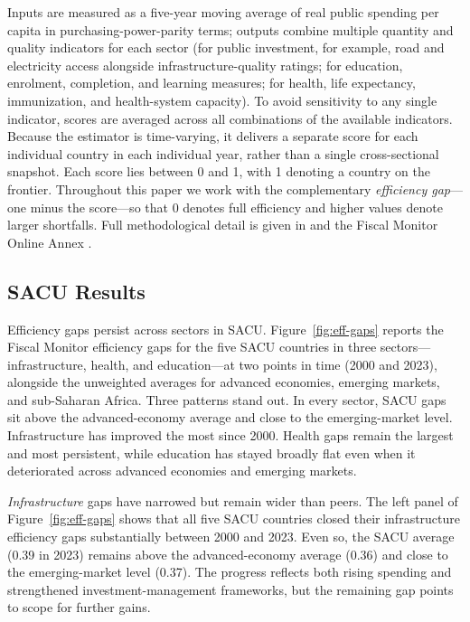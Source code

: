 \documentclass[11pt]{article}
\begin{document}
Inputs are measured as a five-year moving average of real public spending per
capita in purchasing-power-parity terms; outputs combine multiple quantity and
quality indicators for each sector (for public investment, for example, road and
electricity access alongside infrastructure-quality ratings; for education,
enrolment, completion, and learning measures; for health, life expectancy,
immunization, and health-system capacity). To avoid sensitivity to any single
indicator, scores are averaged across all combinations of the available
indicators. Because the estimator is time-varying, it delivers a separate score
for each individual country in each individual year, rather than a single
cross-sectional snapshot. Each score lies between 0 and 1, with 1 denoting a
country on the frontier. Throughout this
paper we work with the complementary \emph{efficiency gap}---one minus the
score---so that 0 denotes full efficiency and higher values denote larger
shortfalls. Full methodological detail is given in
\textcite{bankowskichosher2026} and the Fiscal Monitor Online Annex
\parencite{imf2025annex}.

\subsection{SACU Results}
\label{sec:sacu-results}

Efficiency gaps persist across sectors in SACU. Figure~\ref{fig:eff-gaps}
reports the Fiscal Monitor efficiency gaps for the five SACU countries in three
sectors---infrastructure, health, and education---at two points in time (2000
and 2023), alongside the unweighted averages for advanced economies, emerging
markets, and sub-Saharan Africa. Three patterns stand out. In every sector,
SACU gaps sit above the advanced-economy average and close to the
emerging-market level. Infrastructure has improved the most since 2000. Health
gaps remain the largest and most persistent, while education has stayed broadly
flat even when it deteriorated across advanced economies and emerging markets.

\textit{Infrastructure} gaps have narrowed but remain wider than peers. The
left panel of Figure~\ref{fig:eff-gaps} shows that all five SACU countries
closed their infrastructure efficiency gaps substantially between 2000 and
2023. Even so, the SACU average (0.39 in 2023) remains above the
advanced-economy average (0.36) and close to the emerging-market level (0.37). The progress
reflects both rising spending and strengthened investment-management
frameworks, but the remaining gap points to scope for further gains.
\end{document}
